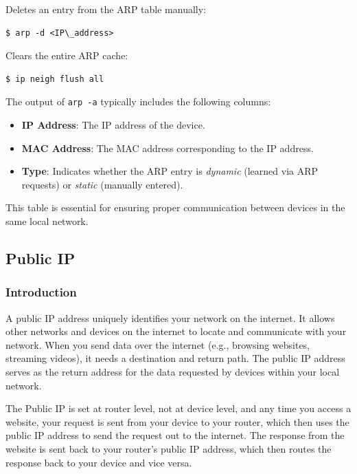 \documentclass{article}
\newenvironment{codetemplate}[1][]{%
  \mybasecolorbox[#1]
  \itshape
}{%
  \endmybasecolorbox
}
\begin{document}
Deletes an entry from the ARP table manually:
\begin{codetemplate}{}
\begin{verbatim}
$ arp -d <IP\_address>
\end{verbatim}
\end{codetemplate}

Clears the entire ARP cache:
\begin{codetemplate}{}
\begin{verbatim}
$ ip neigh flush all
\end{verbatim}
\end{codetemplate}

The output of \texttt{arp -a} typically includes the following columns:
\begin{itemize}
    \item \textbf{IP Address}: The IP address of the device.
    \item \textbf{MAC Address}: The MAC address corresponding to the IP address.
    \item \textbf{Type}: Indicates whether the ARP entry is \textit{dynamic} (learned via ARP requests) or \textit{static} (manually entered).
\end{itemize}
This table is essential for ensuring proper communication between devices in the same local network.

\subsection{Public IP}

\subsubsection{Introduction}
A public IP address uniquely identifies your network on the internet. It allows other networks and devices on the internet to locate and communicate with your network. When you send data over the internet (e.g., browsing websites, streaming videos), it needs a destination and return path. The public IP address serves as the return address for the data requested by devices within your local network.

The Public IP is set at router level, not at device level, and any time you access a website, your request is sent from your device to your router, which then uses the public IP address to send the request out to the internet. The response from the website is sent back to your router's public IP address, which then routes the response back to your device and vice versa.
\end{document}

